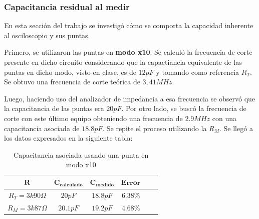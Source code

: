 \documentclass[11pt, a4paper]{article}
\begin{document}
\subsubsection*{Capacitancia residual al medir}

En esta sección del trabajo se investigó cómo se comporta la capacidad inherente al osciloscopio y sus puntas. 

Primero, se utilizaron las puntas en \textbf{modo x10}. Se calculó la frecuencia de corte presente en dicho circuito considerando que la capactiancia equivalente de las puntas en dicho modo, visto en clase, es de $12 pF$ y tomando como referencia $R_T$. Se obtuvo una frecuencia de corte teórica de $3,41MHz$. \par 
Luego, haciendo uso del analizador de impedancia a esa frecuencia se observó que la capacitancia de las puntas era $20 pF$. Por otro lado, se buscó la frecuencia de corte con este último equipo obteniendo una frecuencia de $2.9 MHz$ con una capacitancia asociada de $18.8pF$. Se repite el proceso utilizando la $R_M$. Se llegó a los datos expresados en la siguiente tabla:
 \begin{center}
     \begin{table}[ht]
     \centering
	 \renewcommand{\arraystretch}{1.1}
         \begin{tabular}{c c c c c c}
            \hline 
             $\bm{R}$ &  $\bm{C_{calculado}}$ &    $\bm{C_{medido}}$   &  $\bm{Error}$\\ \hline
             $R_T = 3k90\Omega$  & $20 pF$ & $18.8 pF$ & $6.38\%$ \\  
             $R_M = 3k87\Omega$ & $20.1 pF$ & $19.2 pF$ & $4.68 \%$ \\   \hline
        \end{tabular}
        \caption{Capacitancia asociada usando una punta en modo x10}
        \label{table:valores_punta_x10}
    \end{table}
\end{center}
\end{document}
